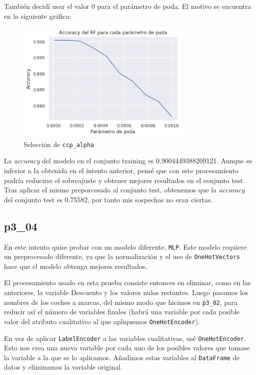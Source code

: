 \documentclass[a4]{article}
\begin{document}
También decidí usar el valor 0 para el parámetro de poda. El motivo se encuentra en la siguiente gráfica:

\begin{figure}[H]
  \centering
  \caption{Selección de \texttt{ccp\_alpha}}
  \includegraphics[width=85mm]{imagenes/p3_02_ccp_alpha}
\end{figure}


La \textit{accuracy} del modelo en el conjunto training es 0.9004449388209121. Aunque es inferior a la obtenida en el intento anterior, pensé que con este procesamiento podría reducirse el sobreajuste y obtener mejores resultados en el conjunto test. Tras aplicar el mismo preporcesado al conjunto test, obtenemos que la \textit{accuracy} del conjunto test es 0.75582, por tanto mis sospechas no eran ciertas.

\subsection{p3\_04}

En este intento quise probar con un modelo diferente, \texttt{MLP}. Este modelo requiere un preprocesado diferente, ya que la normalización y el uso de \texttt{OneHotVectors} hace que el modelo obtenga mejores resultados.

El procesamiento usado en esta prueba consiste entonces en eliminar, como en las anteriores, la variable Descuento y los valores nulos restantes. Luego pasamos los nombres de los coches a marcas, del mismo modo que hicimos en \texttt{p3\_02}, para reducir así el número de variables finales (habrá una variable por cada posible valor del atributo cualitativo al que apliquemos \texttt{OneHotEncoder}).

En vez de aplicar \texttt{LabelEncoder} a las variables cualitativas, usé \texttt{OneHotEncoder}. Esto nos crea una nueva variable por cada uno de los posibles valores que tomase la variable a la que se lo aplicamos. Añadimos estas variables al \texttt{DataFrame} de datos y eliminamos la variable original.
\end{document}

